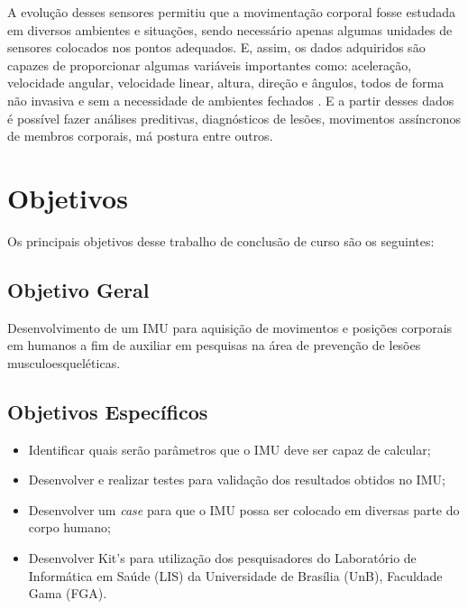 A evolução desses sensores permitiu que a movimentação corporal fosse estudada em diversos ambientes e situações, sendo necessário apenas algumas unidades de sensores colocados nos pontos adequados. E, assim, os dados adquiridos são capazes de proporcionar algumas variáveis importantes como: aceleração, velocidade angular, velocidade linear, altura, direção e ângulos, todos de forma não invasiva e sem a necessidade de ambientes fechados \cite{chang2016}. E a partir desses dados é possível fazer análises preditivas, diagnósticos de lesões, movimentos assíncronos de membros corporais, má postura entre outros.



\section{Objetivos}

Os principais objetivos desse trabalho de conclusão de curso são os seguintes:

\subsection{Objetivo Geral}

Desenvolvimento de um IMU para aquisição de movimentos e posições corporais em humanos a fim de auxiliar em pesquisas na área de prevenção de lesões musculoesqueléticas.

\subsection {Objetivos Específicos} 
 \begin{itemize} 
		\item Identificar quais serão parâmetros que o IMU deve ser capaz de calcular;
		
		\item Desenvolver e realizar testes para validação dos resultados obtidos no IMU;
		
		\item Desenvolver um \textit{case} para que o IMU possa ser colocado em diversas parte do corpo humano;
		
		\item Desenvolver Kit's para utilização dos pesquisadores do Laboratório de Informática em Saúde (LIS) da Universidade de Brasília (UnB), Faculdade Gama (FGA).
		
		
	\end{itemize}
